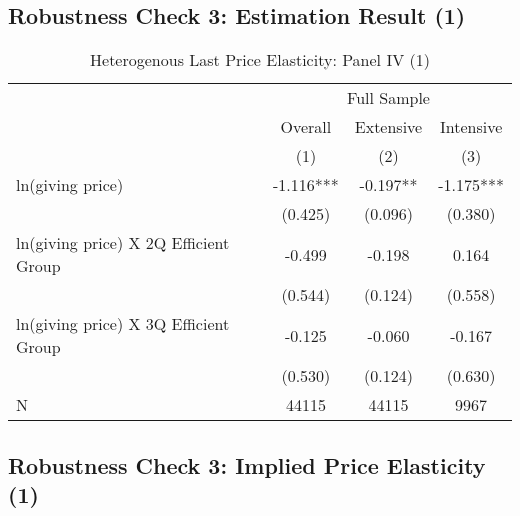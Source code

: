 \documentclass[ review  , 3p ]{elsarticle}
\begin{document}
  \hypertarget{robustness-check-3-estimation-result-1}{%
  \subsection{Robustness Check 3: Estimation Result (1)}\label{robustness-check-3-estimation-result-1}}

  \begin{table}

  \caption{\label{tab:kableHeteroShortElasticitySlide1}Heterogenous Last Price Elasticity: Panel IV (1)}
  \centering
  \fontsize{8}{10}\selectfont
  \begin{tabular}[t]{lccc}
  \toprule
  \multicolumn{1}{c}{ } & \multicolumn{3}{c}{Full Sample} \\
  \cmidrule(l{3pt}r{3pt}){2-4}
  \multicolumn{1}{c}{ } & \multicolumn{1}{c}{Overall} & \multicolumn{1}{c}{Extensive} & \multicolumn{1}{c}{Intensive} \\
  \cmidrule(l{3pt}r{3pt}){2-2} \cmidrule(l{3pt}r{3pt}){3-3} \cmidrule(l{3pt}r{3pt}){4-4}
   & (1) & (2) & (3)\\
  \midrule
  ln(giving price) & -1.116*** & -0.197** & -1.175***\\
   & (0.425) & (0.096) & (0.380)\\
  ln(giving price) X 2Q Efficient Group & -0.499 & -0.198 & 0.164\\
   & (0.544) & (0.124) & (0.558)\\
  ln(giving price) X 3Q Efficient Group & -0.125 & -0.060 & -0.167\\
   & (0.530) & (0.124) & (0.630)\\
  N & 44115 & 44115 & 9967\\
  \bottomrule
  \end{tabular}
  \end{table}

  \hypertarget{robustness-check-3-implied-price-elasticity-1}{%
  \subsection{Robustness Check 3: Implied Price Elasticity (1)}\label{robustness-check-3-implied-price-elasticity-1}}
\end{document}
